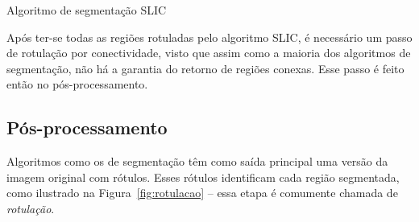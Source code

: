 \begin{espacosimples}
\begin{algorithm2e}[H]
  \caption{Algoritmo de segmentação SLIC}
  \label{algo:slic}
  \SetAlgoLined



\end{algorithm2e}
\end{espacosimples}

\vspace{1.0cm}

Após ter-se todas as regiões rotuladas pelo algoritmo SLIC, é
necessário um passo de rotulação por conectividade, visto que assim
como a maioria dos algoritmos de segmentação, não há a garantia do
retorno de regiões conexas. Esse passo é feito então no
pós-processamento.

\subsection{Pós-processamento}
\label{sec:posproc}

Algoritmos como os de segmentação têm como saída principal uma versão
da imagem original com rótulos. Esses rótulos identificam cada região
segmentada, como ilustrado na Figura~\ref{fig:rotulacao} -- essa etapa
é comumente chamada de \emph{rotulação}.

